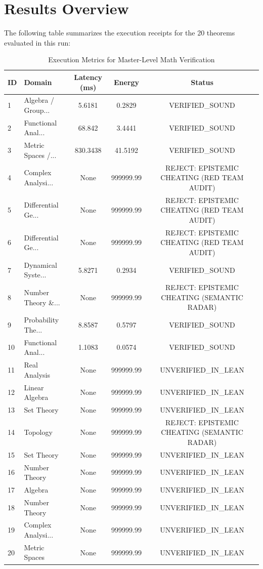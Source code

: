 \documentclass[11pt,a4paper]{article}
\begin{document}
\section{Results Overview}
The following table summarizes the execution receipts for the 20 theorems evaluated in this run:

\begin{table}[h]
\centering
\begin{tabular}{llccc}
\toprule
\textbf{ID} & \textbf{Domain} & \textbf{Latency (ms)} & \textbf{Energy} & \textbf{Status} \\
\midrule
1 & Algebra / Group... & 5.6181 & 0.2829 & VERIFIED\_SOUND \\
2 & Functional Anal... & 68.842 & 3.4441 & VERIFIED\_SOUND \\
3 & Metric Spaces /... & 830.3438 & 41.5192 & VERIFIED\_SOUND \\
4 & Complex Analysi... & None & 999999.99 & REJECT: EPISTEMIC CHEATING (RED TEAM AUDIT) \\
5 & Differential Ge... & None & 999999.99 & REJECT: EPISTEMIC CHEATING (RED TEAM AUDIT) \\
6 & Differential Ge... & None & 999999.99 & REJECT: EPISTEMIC CHEATING (RED TEAM AUDIT) \\
7 & Dynamical Syste... & 5.8271 & 0.2934 & VERIFIED\_SOUND \\
8 & Number Theory \&... & None & 999999.99 & REJECT: EPISTEMIC CHEATING (SEMANTIC RADAR) \\
9 & Probability The... & 8.8587 & 0.5797 & VERIFIED\_SOUND \\
10 & Functional Anal... & 1.1083 & 0.0574 & VERIFIED\_SOUND \\
11 & Real Analysis & None & 999999.99 & UNVERIFIED\_IN\_LEAN \\
12 & Linear Algebra & None & 999999.99 & UNVERIFIED\_IN\_LEAN \\
13 & Set Theory & None & 999999.99 & UNVERIFIED\_IN\_LEAN \\
14 & Topology & None & 999999.99 & REJECT: EPISTEMIC CHEATING (SEMANTIC RADAR) \\
15 & Set Theory & None & 999999.99 & UNVERIFIED\_IN\_LEAN \\
16 & Number Theory & None & 999999.99 & UNVERIFIED\_IN\_LEAN \\
17 & Algebra & None & 999999.99 & UNVERIFIED\_IN\_LEAN \\
18 & Number Theory & None & 999999.99 & UNVERIFIED\_IN\_LEAN \\
19 & Complex Analysi... & None & 999999.99 & UNVERIFIED\_IN\_LEAN \\
20 & Metric Spaces & None & 999999.99 & UNVERIFIED\_IN\_LEAN \\
\bottomrule
\end{tabular}
\caption{Execution Metrics for Master-Level Math Verification}
\end{table}
\end{document}
